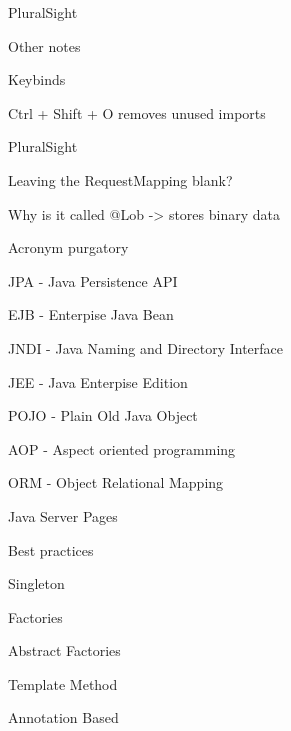 \documentclass[presentation]{beamer}
\begin{document}
\begin{frame}[label={sec:org34d6546}]{PluralSight}
\begin{block}{Other notes}
\begin{block}{Keybinds}
\begin{block}{Ctrl + Shift + O}
removes unused imports
\end{block}
\end{block}
\begin{block}{PluralSight}
\begin{block}{Leaving the RequestMapping blank?}
\end{block}
\end{block}
\begin{block}{Why is it called @Lob}
-> stores binary data
\end{block}
\begin{block}{Acronym purgatory}
\begin{block}{JPA - Java Persistence API}
\end{block}
\begin{block}{EJB - Enterpise Java Bean}
\end{block}
\begin{block}{JNDI - Java Naming and Directory Interface}
\end{block}
\begin{block}{JEE - Java Enterpise Edition}
\end{block}
\begin{block}{POJO - Plain Old Java Object}
\end{block}
\begin{block}{AOP - Aspect oriented programming}
\end{block}
\begin{block}{ORM - Object Relational Mapping}
\end{block}
\begin{block}{Java Server Pages}
\end{block}
\end{block}
\begin{block}{Best practices}
\begin{block}{Singleton}
\end{block}
\begin{block}{Factories}
\end{block}
\begin{block}{Abstract Factories}
\end{block}
\begin{block}{Template Method}
\end{block}
\begin{block}{Annotation Based}
\end{block}
\end{block}
\end{block}
\end{frame}
\end{document}
